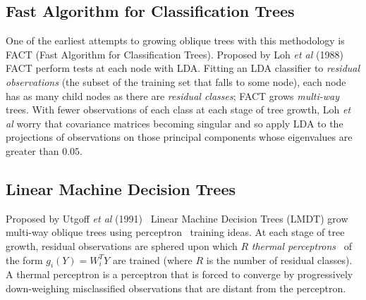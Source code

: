 \subsection{Fast Algorithm for Classification Trees}
\label{FastAlgorithmforClassificationTrees}
One of the earliest attempts to growing oblique trees with this methodology is FACT (Fast Algorithm for Classification Trees). Proposed by Loh \emph{et al} (1988)~\cite{Loh:1988:TSC} FACT perform tests at each node with LDA. Fitting an LDA classifier to \emph{residual observations} (the subset of the training set that falls to some node), each node has as many child nodes as there are \emph{residual classes}; FACT grows \emph{multi-way} trees. With fewer observations of each class at each stage of tree growth, Loh \emph{et al} worry that covariance matrices becoming singular and so apply LDA to the projections of observations on those principal components whose eigenvalues are greater than $0.05$. %

\subsection{Linear Machine Decision Trees}
\label{LinearMachineDecisionTrees}
Proposed by Utgoff \emph{et al} (1991)~\cite{utgoff91linear}\cite{brodley92multivariatea}\cite{brodley92multivariateb} Linear Machine Decision Trees (LMDT) grow multi-way oblique trees using perceptron~\cite{rosenblatt58} training ideas. At each stage of tree growth, residual observations are sphered upon which $R$ \emph{thermal perceptrons}~\cite{159794} of the form $g_i(Y)=W_i^TY$ are trained (where $R$ is the number of residual classes). A thermal perceptron is a perceptron that is forced to converge by progressively down-weighing misclassified observations that are distant from the perceptron. 

